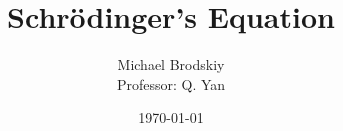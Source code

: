 


\title{Schr\"odinger's Equation}
\date{\today}
\author{Michael Brodskiy\\ \small Professor: Q. Yan}



\maketitle

\newpage

\tableofcontents

\newpage

